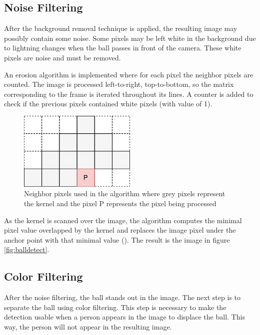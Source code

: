 \subsection{Noise Filtering}

After the background removal technique is applied, the resulting image may possibly contain some noise. Some pixels may be left white in the background due to lightning changes when the ball passes in front of the camera. These white pixels are noise and must be removed.

An erosion algorithm is implemented where for each pixel the neighbor pixels are counted. The image is processed left-to-right, top-to-bottom, so the matrix corresponding to the frame is iterated throughout its lines. A counter is added to check if the previous pixels contained white pixels (with value of 1). 

\begin{figure}[htp]
	
	\centering
	\includegraphics[width=0.5\textwidth]{capcalib/imgs/neighpixel.pdf}
	
	\caption{Neighbor pixels used in the algorithm where grey pixels represent the kernel and the pixel P represents the pixel being processed}
	\label{fig:neigh_cnt}
	
\end{figure}

As the kernel is scanned over the image, the algorithm computes the minimal pixel value overlapped by the kernel and replaces the image pixel under the anchor point with that minimal value (\cite{OpenCV2.4.13.6documentation}). The result is the image in figure \ref{fig:balldetect}.

\subsection{Color Filtering}

After the noise filtering, the ball stands out in the image. The next step is to separate the ball using color filtering. This step is necessary to make the detection usable when a person appears in the image to displace the ball. This way, the person will not appear in the resulting image.

